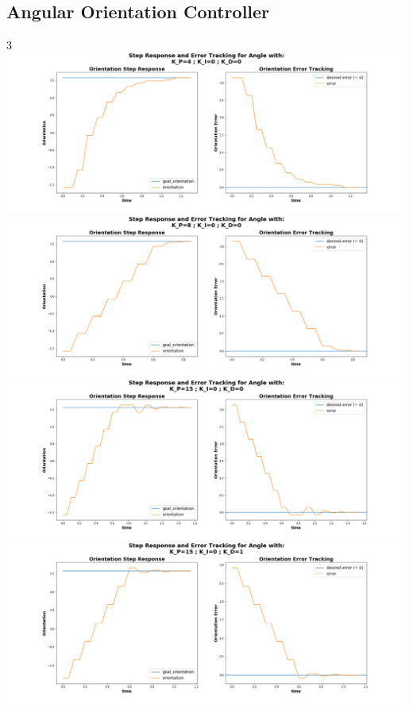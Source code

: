 \documentclass[a4paper,12pt]{article}
\begin{document}
	\subsection{Angular Orientation Controller}
3	\includegraphics[scale=0.4]{images/control_ang_4_0_0.png}
	\includegraphics[scale=0.4]{images/control_ang_8_0_0.png}
	\includegraphics[scale=0.4]{images/control_ang_15_0_0.png}
	\\
	\includegraphics[scale=0.4]{images/control_ang_15_0_1.png}
\end{document}

